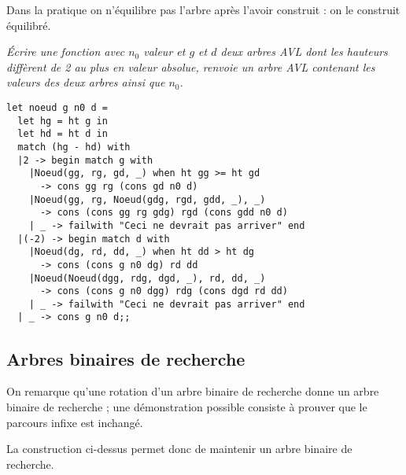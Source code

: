 Dans la pratique on n'équilibre pas l'arbre après l'avoir construit : on le construit équilibré.
\begin{Exercise}\it 
Écrire une fonction  avec $n_0$ valeur et $g$ et $d$ deux arbres AVL dont les hauteurs diffèrent de 2 au plus en valeur absolue, renvoie un arbre AVL  contenant les valeurs des deux arbres ainsi que $n_0$.
\end{Exercise}
\begin{Answer} 
\begin{lstlisting}
let noeud g n0 d =
  let hg = ht g in
  let hd = ht d in
  match (hg - hd) with
  |2 -> begin match g with
    |Noeud(gg, rg, gd, _) when ht gg >= ht gd 
      -> cons gg rg (cons gd n0 d)
    |Noeud(gg, rg, Noeud(gdg, rgd, gdd, _), _)
      -> cons (cons gg rg gdg) rgd (cons gdd n0 d)
    | _ -> failwith "Ceci ne devrait pas arriver" end
  |(-2) -> begin match d with
    |Noeud(dg, rd, dd, _) when ht dd > ht dg
      -> cons (cons g n0 dg) rd dd
    |Noeud(Noeud(dgg, rdg, dgd, _), rd, dd, _) 
      -> cons (cons g n0 dgg) rdg (cons dgd rd dd)
    | _ -> failwith "Ceci ne devrait pas arriver" end
  | _ -> cons g n0 d;;
\end{lstlisting}
\newpage
\end{Answer}
\subsection{Arbres binaires de recherche}
On remarque qu'une rotation d'un arbre binaire de recherche donne un arbre binaire de recherche ; une démonstration possible consiste à prouver que le parcours infixe est inchangé.

La construction ci-dessus permet donc de maintenir un arbre binaire de recherche.

